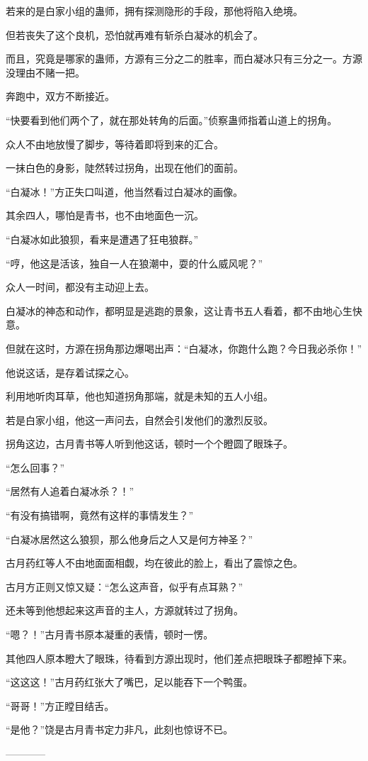 \begin{this_body}
若来的是白家小组的蛊师，拥有探测隐形的手段，那他将陷入绝境。

但若丧失了这个良机，恐怕就再难有斩杀白凝冰的机会了。

而且，究竟是哪家的蛊师，方源有三分之二的胜率，而白凝冰只有三分之一。方源没理由不赌一把。

奔跑中，双方不断接近。

“快要看到他们两个了，就在那处转角的后面。”侦察蛊师指着山道上的拐角。

众人不由地放慢了脚步，等待着即将到来的汇合。

一抹白色的身影，陡然转过拐角，出现在他们的面前。

“白凝冰！”方正失口叫道，他当然看过白凝冰的画像。

其余四人，哪怕是青书，也不由地面色一沉。

“白凝冰如此狼狈，看来是遭遇了狂电狼群。”

“哼，他这是活该，独自一人在狼潮中，耍的什么威风呢？”

众人一时间，都没有主动迎上去。

白凝冰的神态和动作，都明显是逃跑的景象，这让青书五人看着，都不由地心生快意。

但就在这时，方源在拐角那边爆喝出声：“白凝冰，你跑什么跑？今日我必杀你！”

他说这话，是存着试探之心。

利用地听肉耳草，他也知道拐角那端，就是未知的五人小组。

若是白家小组，他这一声问去，自然会引发他们的激烈反驳。

拐角这边，古月青书等人听到他这话，顿时一个个瞪圆了眼珠子。

“怎么回事？”

“居然有人追着白凝冰杀？！”

“有没有搞错啊，竟然有这样的事情发生？”

“白凝冰居然这么狼狈，那么他身后之人又是何方神圣？”

古月药红等人不由地面面相觑，均在彼此的脸上，看出了震惊之色。

古月方正则又惊又疑：“怎么这声音，似乎有点耳熟？”

还未等到他想起来这声音的主人，方源就转过了拐角。

“嗯？！”古月青书原本凝重的表情，顿时一愣。

其他四人原本瞪大了眼珠，待看到方源出现时，他们差点把眼珠子都瞪掉下来。

“这这这！”古月药红张大了嘴巴，足以能吞下一个鸭蛋。

“哥哥！”方正瞠目结舌。

“是他？”饶是古月青书定力非凡，此刻也惊讶不已。

------------

\end{this_body}

